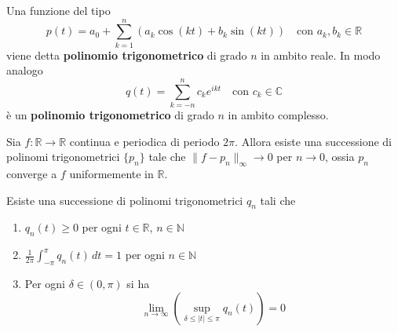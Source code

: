 \begin{definition}\label{def:polinomio_trig}
Una funzione del tipo
\[
    p{(t)} = a_{0} + \sum_{k=1}^{n} {(a_{k} \cos{(kt)} + b_{k} \sin{(kt)})} \quad
    \text{con } a_{k}, b_{k} \in \mathbb{R}
\]
viene detta \textbf{polinomio trigonometrico} di grado \(n\) in ambito reale.
In modo analogo 
\[
    q{(t)} = \sum_{k=-n}^{n} c_{k} e ^{ikt} \quad \text{con } c_{k} \in \mathbb{C}
\]
è un \textbf{polinomio trigonometrico} di grado \(n\) in ambito complesso.
\end{definition}
\begin{theorem}[Weierstrass]\label{thm:weierstrass}
     Sia \(f : \mathbb{R} \to  \mathbb{R}\) continua e periodica di periodo
     \(2\pi\). Allora esiste una successione di polinomi trigonometrici
     \(\{p_{n}\} \) tale che \(\|f - p_{n}\|_{\infty} \to 0\) per \(n \to 0\),
     ossia \(p_{n}\) converge a \(f\) uniformemente in \(\mathbb{R}\).
\end{theorem}
\begin{lemma}
    Esiste una successione di polinomi trigonometrici \(q_{n}\) tali che 
\begin{enumerate}[label = \alph*.]
    \item \(q_{n}{(t)} \ge 0\) per ogni \(t \in \mathbb{R}\), \(n \in
        \mathbb{N}\)
    \item \(\frac{1}{2\pi}\int_{-\pi}^{\pi} q_{n}{(t)} \,dt = 1\) per ogni \(n
        \in \mathbb{N}\)
    \item Per ogni \(\delta \in {(0, \pi)}\) si ha 
        \[
          \lim_{n \to \infty} {\left( \sup_{\delta \le |t| \le \pi} q_{n}{(t)}
          \right)} = 0
        \]
\end{enumerate}
\end{lemma}

